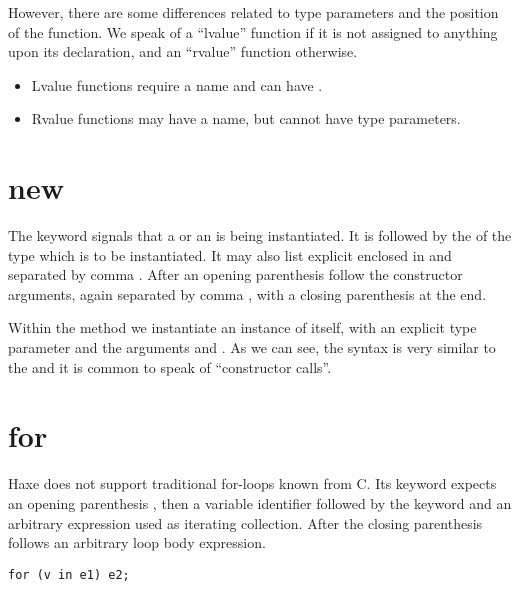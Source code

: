 However, there are some differences related to type parameters and the position of the function. We speak of a ``lvalue'' function if it is not assigned to anything upon its declaration, and an ``rvalue'' function otherwise.

\begin{itemize}
	\item Lvalue functions require a name and can have .
	\item Rvalue functions may have a name, but cannot have type parameters.
\end{itemize}


\section{new}
\label{expression-new}

The  keyword signals that a  or an  is being instantiated. It is followed by the  of the type which is to be instantiated. It may also list explicit  enclosed in \expr{<>} and separated by comma \expr{,}. After an opening parenthesis \expr{()} follow the constructor arguments, again separated by comma \expr{,}, with a closing parenthesis \expr{)} at the end.


Within the  method we instantiate an instance of  itself, with an explicit type parameter  and the arguments  and . As we can see, the syntax is very similar to the  and it is common to speak of ``constructor calls''.



\section{for}
\label{expression-for}

Haxe does not support traditional for-loops known from C. Its  keyword expects an opening parenthesis \expr{(}, then a variable identifier followed by the keyword  and an arbitrary expression used as iterating collection. After the closing parenthesis \expr{)} follows an arbitrary loop body expression.

\begin{lstlisting}
for (v in e1) e2;
\end{lstlisting}


